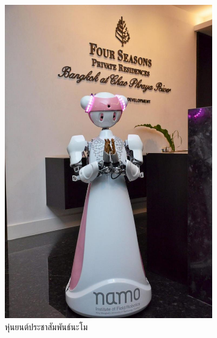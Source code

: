 \begin{figure}[htbp]
    \centering
    \begin{subfigure}[b]{0.3\textwidth}
        \centering
        \includegraphics[width=\textwidth]{chapter2/images/namo.jpg}
        \caption{หุ่นยนต์ประชาสัมพันธ์นะโม}
        \label{fig:namo}
    \end{subfigure}
    \hfill
    \begin{subfigure}[b]{0.3\textwidth}
        \centering

\end{subfigure}
\end{figure}
